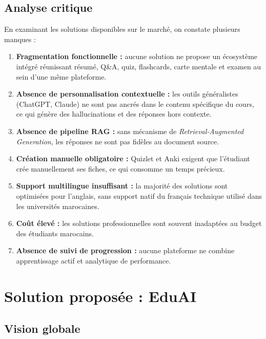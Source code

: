 \subsection{Analyse critique}

En examinant les solutions disponibles sur le marché, on constate plusieurs manques :

\begin{enumerate}[label=\textbf{C\arabic*.}]
  \item \textbf{Fragmentation fonctionnelle :} aucune solution ne propose un écosystème intégré réunissant résumé, Q\&A, quiz, flashcards, carte mentale et examen au sein d'une même plateforme.
  
  \item \textbf{Absence de personnalisation contextuelle :} les outils généralistes (ChatGPT, Claude) ne sont pas ancrés dans le contenu spécifique du cours, ce qui génère des hallucinations et des réponses hors contexte.
  
  \item \textbf{Absence de pipeline RAG :} sans mécanisme de \textit{Retrieval-Augmented Generation}, les réponses ne sont pas fidèles au document source.
  
  \item \textbf{Création manuelle obligatoire :} Quizlet et Anki exigent que l'étudiant crée manuellement ses fiches, ce qui consomme un temps précieux.
  
  \item \textbf{Support multilingue insuffisant :} la majorité des solutions sont optimisées pour l'anglais, sans support natif du français technique utilisé dans les universités marocaines.
  
  \item \textbf{Coût élevé :} les solutions professionnelles sont souvent inadaptées au budget des étudiants marocains.
  
  \item \textbf{Absence de suivi de progression :} aucune plateforme ne combine apprentissage actif et analytique de performance.
\end{enumerate}

\section{Solution proposée : EduAI}

\subsection{Vision globale}

